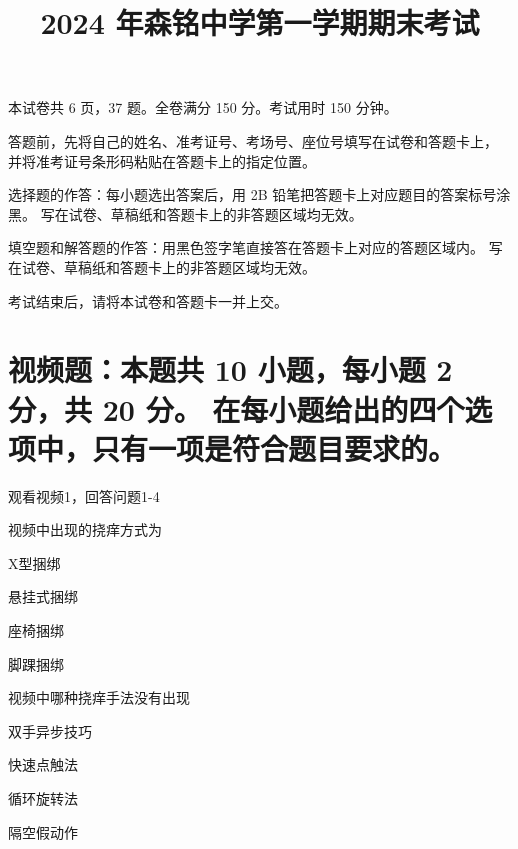 \documentclass{exam-zh}
\title{2024 年森铭中学第一学期期末考试}
\begin{document}

\secret

\maketitle

本试卷共 6 页，37 题。全卷满分 150 分。考试用时 150 分钟。


\begin{notice}
  \item 答题前，先将自己的姓名、准考证号、考场号、座位号填写在试卷和答题卡上，
    并将准考证号条形码粘贴在答题卡上的指定位置。
  \item 选择题的作答：每小题选出答案后，用 2B 铅笔把答题卡上对应题目的答案标号涂黑。
    写在试卷、草稿纸和答题卡上的非答题区域均无效。
  \item 填空题和解答题的作答：用黑色签字笔直接答在答题卡上对应的答题区域内。
    写在试卷、草稿纸和答题卡上的非答题区域均无效。
  \item 考试结束后，请将本试卷和答题卡一并上交。
\end{notice}



\section{%
  视频题：本题共 10 小题，每小题 2 分，共 20 分。
  在每小题给出的四个选项中，只有一项是符合题目要求的。
}

观看视频1，回答问题1-4


\begin{question}[points = 2]
  视频中出现的挠痒方式为



  \begin{choices}
    \item X型捆绑
    \item 悬挂式捆绑
    \item 座椅捆绑
    \item 脚踝捆绑
  \end{choices}
\end{question}

\begin{question}[points = 2]
  视频中哪种挠痒手法没有出现



  \begin{choices}
    \item 双手异步技巧
    \item 快速点触法
    \item 循环旋转法
    \item 隔空假动作
  \end{choices}
\end{question}
\end{document}
